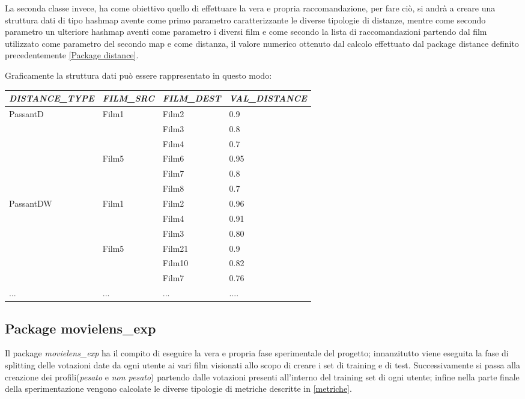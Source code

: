 La seconda classe invece, ha come obiettivo quello di effettuare la vera e propria raccomandazione, per fare ciò, si andrà a creare una struttura dati di tipo hashmap avente come primo parametro caratterizzante le diverse tipologie di distanze, mentre come secondo parametro un ulteriore hashmap aventi come parametro i diversi film e come secondo la lista di raccomandazioni partendo dal film utilizzato come parametro del secondo map e come distanza, il valore numerico ottenuto dal calcolo effettuato dal package distance definito precedentemente \ref{Package distance}. 

Graficamente la struttura dati può essere rappresentato in questo modo:

\begin{table}[H]
	\begin{tabular}{l | l | l | l }
	\emph{DISTANCE\_TYPE} & \emph{FILM\_SRC} & \emph{FILM\_DEST} & \emph{VAL\_DISTANCE} \\
	\toprule
		\multirow{6}{*}{PassantD} & \multirow{3}{*}{Film1} & Film2 & 0.9 \\
		&  & Film3 & 0.8 \\
		&  & Film4 & 0.7 \\ \cline{2-4}
		& \multirow{2}{*}{Film5} & Film6 & 0.95 \\ 
		& & Film7 & 0.8 \\
		& & Film8 & 0.7 \\ \bottomrule
		\multirow{6}{*}{PassantDW} & \multirow{3}{*}{Film1} & Film2 & 0.96 \\
		&  & Film4 & 0.91 \\ 
		&  & Film3 & 0.80 \\ \cline{2-4}
		& \multirow{2}{*}{Film5} & Film21 & 0.9 \\ 
		& & Film10 & 0.82 \\
		& & Film7 & 0.76 \\ \bottomrule
		... & ... & ... & ....
	\end{tabular}
\end{table}


\subsection{Package movielens\_exp}
Il package \emph{movielens\_exp} ha il compito di eseguire la vera e propria fase sperimentale del progetto; innanzitutto viene eseguita la fase di splitting delle votazioni date da ogni utente ai vari film visionati allo scopo di creare i set di training e di test. Successivamente si passa alla creazione dei profili(\emph{pesato} e \emph{non pesato}) partendo dalle votazioni presenti all'interno del training set di ogni utente; infine nella parte finale della sperimentazione vengono calcolate le diverse tipologie di metriche descritte in \ref{metriche}.

